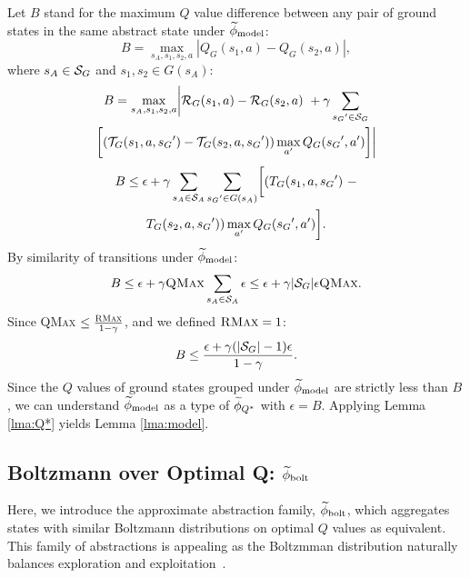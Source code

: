 Let $B$ stand for the maximum $Q$ value difference between any pair of ground states in the same abstract state under $\widetilde \phi_{\text{model}}$:
\begin{equation*}
B = \max_{s_A, s_1, s_2, a}  |Q_G(s_1, a) - Q_G(s_2, a)|,
\end{equation*}
where $s_A \in \mathcal{S}_G$ and $s_1, s_2 \in G(s_A)$:
\begin{multline*}
B=\max_{s_A, s_1, s_2, a}      \biggl|\mathcal{R}_G(s_1, a) - \mathcal{R}_G(s_2, a)\ + \gamma \sum_{{s_G}' \in \mathcal{S}_G} \\
\biggl[(\mathcal{T}_G(s_1,a,{s_G}') -\mathcal{T}_G(s_2, a, {s_G}'))\max_{a'}Q_G({s_G}', a')\biggr]\biggr|
\end{multline*}
\begin{multline*}
B\leq \epsilon + \gamma \sum_{s_A \in \mathcal{S}_A}\sum_{{s_G}' \in G(s_A)} \biggl[(T_G(s_1, a, {s_G}')\ -\\ 
T_G(s_2, a, {s_G}')) \max_{a'}Q_G({s_G}', a') \biggr].
\end{multline*}
By similarity of transitions under $\widetilde \phi_{\text{model}}$:
\begin{align*}
B \leq \epsilon + \gamma \textsc{QMax} \sum_{s_A \in \mathcal{S}_A} \epsilon \leq \epsilon + \gamma|\mathcal{S}_G|\epsilon \textsc{QMax}.
\end{align*}
Since \textsc{QMax} $\leq \frac{\textsc{RMax}}{1-\gamma}$, and we defined $\textsc{RMax} = 1$:
\begin{equation*}
B \leq \frac{\epsilon + \gamma(|\mathcal{S}_G| - 1) \epsilon}{1-\gamma}.
\end{equation*}
Since the $Q$ values of ground states grouped under $\widetilde \phi_{\text{model}}$ are strictly less than $B$, we can understand $\widetilde \phi_{\text{model}}$ as a type of $\widetilde \phi_{Q^*}$ with $\epsilon = B$. Applying Lemma \ref{lma:Q*} yields Lemma \ref{lma:model}.
\subsection{Boltzmann over Optimal Q: $\widetilde \phi_{\text{bolt}}$}
\label{sec:boltz}

Here, we introduce the approximate abstraction family, $\widetilde \phi_{\text{bolt}}$, which aggregates states with similar Boltzmann distributions on optimal $Q$ values as equivalent. This family of abstractions is appealing as the Boltzmman distribution naturally balances exploration and exploitation~\cite{sutton1998reinforcement}.

